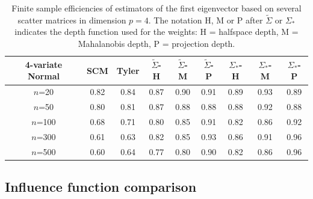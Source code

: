 \begin{table}[t]
\begin{center}
\begin{scriptsize}
\begin{tabular}{c|cc|ccc|ccc}
    4-variate Normal   & SCM  & Tyler & $\tilde{\Sigma}$-H & $\tilde{\Sigma}$-M & $\tilde{\Sigma}$-P & ${\Sigma}_{*}$-H & ${\Sigma}_{*}$-M & ${\Sigma}_{*}$-P \\ \hline
    $n$=20             & 0.82 & 0.84  & 0.87   & 0.90   & 0.91  & 0.89    & 0.93    & 0.89   \\
    $n$=50             & 0.80 & 0.81  & 0.87   & 0.88   & 0.88  & 0.88    & 0.92    & 0.88   \\
    $n$=100            & 0.68 & 0.71  & 0.80   & 0.85   & 0.91  & 0.82    & 0.86    & 0.92   \\
    $n$=300            & 0.61 & 0.63  & 0.82   & 0.85   & 0.93  & 0.86    & 0.91    & 0.96   \\
    $n$=500            & 0.60 & 0.64  & 0.77   & 0.80   & 0.90  & 0.82    & 0.86    & 0.96   \\ \hline
    \end{tabular}
\end{scriptsize}
\caption{Finite sample efficiencies of estimators of the first eigenvector based on 
several scatter matrices in dimension $p=4$. The notation
 H, M or P after $\tilde{\Sigma}$ or ${\Sigma}_{*}$ indicates the depth function 
 used for the weights: H = halfspace depth, M = Mahalanobis depth, P = projection depth.}
\label{table:FSEtable4}
\end{center}
\end{table}

\subsection{Influence function comparison}

